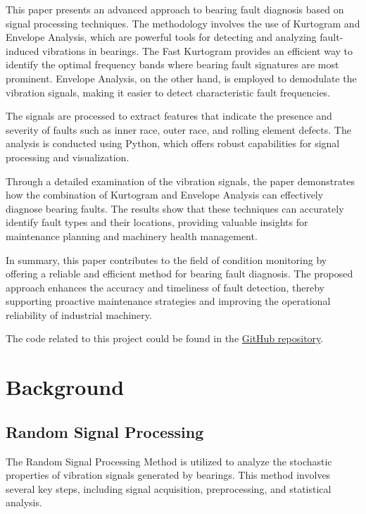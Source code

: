 \documentclass[conference]{IEEEtran}
\begin{document}
This paper presents an advanced approach to bearing fault diagnosis based on signal processing techniques. The methodology involves the use of Kurtogram and Envelope Analysis, which are powerful tools for detecting and analyzing fault-induced vibrations in bearings. The Fast Kurtogram provides an efficient way to identify the optimal frequency bands where bearing fault signatures are most prominent. Envelope Analysis, on the other hand, is employed to demodulate the vibration signals, making it easier to detect characteristic fault frequencies.

The signals are processed to extract features that indicate the presence and severity of faults such as inner race, outer race, and rolling element defects. The analysis is conducted using Python, which offers robust capabilities for signal processing and visualization.

Through a detailed examination of the vibration signals, the paper demonstrates how the combination of Kurtogram and Envelope Analysis can effectively diagnose bearing faults. The results show that these techniques can accurately identify fault types and their locations, providing valuable insights for maintenance planning and machinery health management.

In summary, this paper contributes to the field of condition monitoring by offering a reliable and efficient method for bearing fault diagnosis. The proposed approach enhances the accuracy and timeliness of fault detection, thereby supporting proactive maintenance strategies and improving the operational reliability of industrial machinery.

The code related to this project could be found in the \href{https://github.com/Languisher/DSP-Project-202405}{GitHub repository}.

\section{Background}

\subsection{Random Signal Processing}

The Random Signal Processing Method is utilized to analyze the stochastic properties of vibration signals generated by bearings. This method involves several key steps, including signal acquisition, preprocessing, and statistical analysis.
\end{document}
